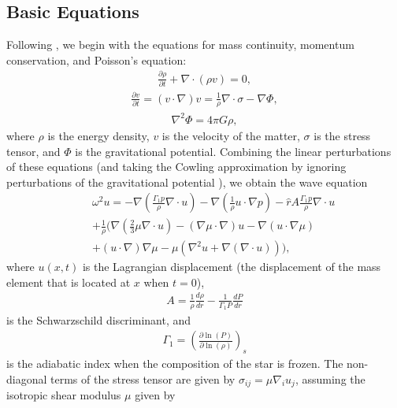 \documentclass[fleqn,usenatbib]{mnras}
\begin{document}
\subsection{Basic Equations}
\hspace{\parindent}Following \citet{mcdermott1988nonradial}, we begin with the equations for mass continuity, momentum conservation, and Poisson's equation:
\begin{align}
\frac{\partial\rho}{\partial t}+\nabla\cdot(\rho v)=0,
\label{eq:continuity_eqn}
\end{align}
\begin{align}
\frac{\partial v}{\partial t}=(v\cdot \nabla)v=\frac{1}{\rho}\nabla\cdot\sigma-\nabla\Phi,
\label{eq:momentum_eqn}
\end{align}
\begin{align}
\nabla^2\Phi=4\pi G\rho,
\label{eq:Poisson_eqn}
\end{align}
\noindent where $\rho$ is the energy density, $v$ is the velocity of the matter, $\sigma$ is the stress tensor, and $\Phi$ is the gravitational potential. Combining the linear perturbations of these equations (and taking the Cowling approximation by ignoring perturbations of the gravitational potential \citet{cowling1941non}), we obtain the wave equation
\begin{align}\nonumber
&&\omega^2u=-\nabla\left(\frac{\Gamma_1 p}{\rho}\nabla\cdot u\right)-\nabla\left(\frac{1}{\rho}u\cdot\nabla p\right)-\hat{r}A\frac{\Gamma_1 p}{\rho}\nabla\cdot u\\\nonumber
&&+\frac{1}{\rho}\biggr(\nabla\left(\frac{2}{3}\mu\nabla\cdot u\right)-\left(\nabla\mu\cdot\nabla\right)u-\nabla\left(u\cdot\nabla\mu\right)\\
&&+\left(u\cdot\nabla\right)\nabla\mu-\mu\left(\nabla^2 u+\nabla\left(\nabla\cdot u\right)\right)\biggr),
\label{eq:wave_eqn}
\end{align}
where $u(x,t)$ is the Lagrangian displacement (the displacement of the mass element that is located at $x$ when $t=0$),
\begin{align}
A=\frac{1}{\rho}\frac{d\rho}{dr}-\frac{1}{\Gamma_1P}\frac{dP}{dr}
\label{eq:schwartz_descrim}
\end{align}
\noindent is the Schwarzschild discriminant, and
\begin{align}
\Gamma_1=\left(\frac{\partial\ln(P)}{\partial\ln(\rho)}\right)_s
\label{eq:adiabatic_index}
\end{align}
\noindent is the adiabatic index when the composition of the star is frozen. The non-diagonal terms of the stress tensor are given by $\sigma_{ij} = \mu \nabla_i u_j$, assuming the isotropic shear modulus $\mu$ given by \citet{strohmayer1991shear}
\end{document}
